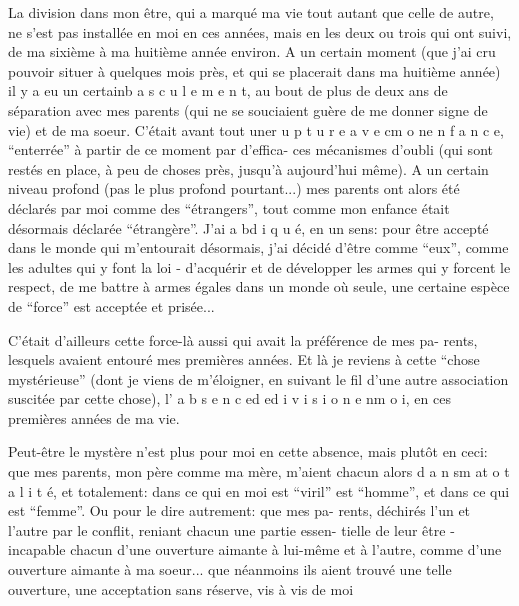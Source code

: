 La division dans mon être, qui a marqué ma vie tout autant que celle de 
autre, ne s'est pas installée en moi en ces années, mais en les deux ou trois 
qui ont suivi, de ma sixième à ma huitième année environ. A un certain moment
(que j'ai cru pouvoir situer à quelques mois près, et qui se placerait dans ma
huitième année) il y a eu un certain\quad b a s c u l e m e n t\quad, au bout de plus
de deux ans de séparation avec mes parents (qui ne se souciaient guère de me
donner signe de vie) et de ma soeur. C'était avant tout une\quad r u p t u r e\quad
a v e c\quad m o n\quad e n f a n c e\quad, ``enterrée'' à partir de ce moment par d'effica-\newline
ces mécanismes d'oubli (qui sont restés en place, à peu de choses près, jusqu'à
aujourd'hui même). A un certain niveau profond (pas le plus profond pourtant...)
mes parents ont alors été déclarés par moi comme des ``étrangers'', tout comme mon
enfance était désormais déclarée ``étrangère''. J'ai a bd i q u é\quad, en un sens:
pour être accepté dans le monde qui m'entourait désormais, j'ai décidé d'être
comme ``eux'', comme les adultes qui y font la loi - d'acquérir et de développer
les armes qui y forcent le respect, de me battre à armes égales dans un monde où
seule, une certaine espèce de ``force'' est acceptée et prisée...

C'était d'ailleurs cette force-là aussi qui avait la préférence de mes pa-\newline
rents, lesquels avaient entouré mes premières années. Et là je reviens à cette
``chose mystérieuse'' (dont je viens de m'éloigner, en suivant le fil d'une autre
association suscitée par cette chose), l' a b s e n c e\quad d e\quad d i v i s i o n\quad
e n\quad m o i\quad, en ces premières années de ma vie.

Peut-être le mystère n'est plus pour moi en cette absence, mais plutôt en \unsure{;}
ceci: que mes parents, mon père comme ma mère, m'aient chacun alors 
d a n s\quad m a\quad t o t a l i t é\quad, et totalement: dans ce qui en moi est ``viril''
est ``homme'', et dans ce qui est ``femme''. Ou pour le dire autrement: que mes pa-\newline
rents, déchirés l'un et l'autre par le conflit, reniant chacun une partie essen-\newline
tielle de leur être - incapable chacun d'une ouverture aimante à lui-même et à
l'autre, comme d'une ouverture aimante à ma soeur... que néanmoins ils aient
trouvé une telle ouverture, une acceptation sans réserve, vis à vis de moi

